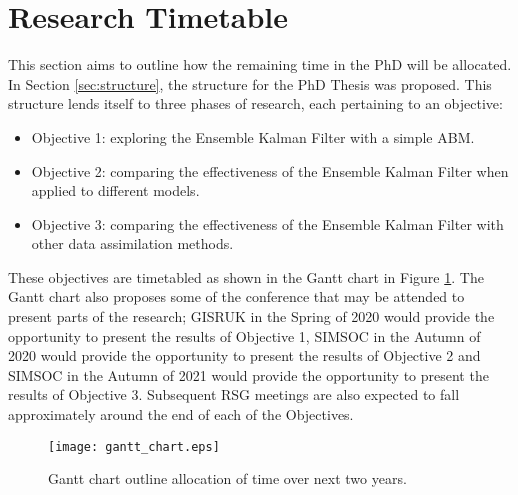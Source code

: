 \section{Research Timetable}\label{sec:timetable}

This section aims to outline how the remaining time in the PhD will be
allocated.
In Section \ref{sec:structure}, the structure for the PhD Thesis was proposed.
This structure lends itself to three phases of research, each pertaining to an
objective:
\begin{itemize}
    \item Objective 1: exploring the Ensemble Kalman Filter with a simple ABM.
    \item Objective 2: comparing the effectiveness of the Ensemble Kalman Filter
        when applied to different models.
    \item Objective 3: comparing the effectiveness of the Ensemble Kalman Filter
        with other data assimilation methods.
\end{itemize}
These objectives are timetabled as shown in the Gantt chart in Figure
\ref{fig:gantt_chart}.
The Gantt chart also proposes some of the conference that may be attended to
present parts of the research; GISRUK in the Spring of 2020 would provide the
opportunity to present the results of Objective 1, SIMSOC in the Autumn of 2020
would provide the opportunity to present the results of Objective 2 and SIMSOC
in the Autumn of 2021 would provide the opportunity to present the results of
Objective 3.
Subsequent RSG meetings are also expected to fall approximately around the end
of each of the Objectives.

\begin{figure}[h!]
    \centering
    \texttt{[image: gantt\_chart.eps]}
    \caption{Gantt chart outline allocation of time over next two
    years.}\label{fig:gantt_chart}
\end{figure}

\newpage
